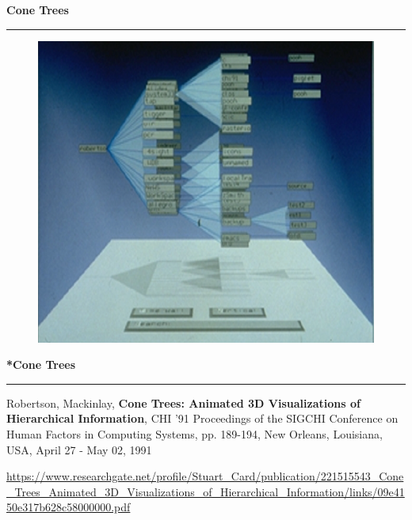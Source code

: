 \documentclass[pdf]{beamer}
\begin{document}
\begin{frame}
{\textbf{Cone Trees}}{\textcolor{red}{\rule{12cm}{1.2pt}}}

\begin{figure}
\includegraphics[scale=0.4]{43_Picture1.png}
\end{figure}

\end{frame}



\begin{frame}
{\textbf{*Cone Trees}}{\textcolor{red}{\rule{12cm}{1.2pt}}}

Robertson, Mackinlay, \textbf{Cone Trees: Animated 3D Visualizations of Hierarchical Information}, CHI '91 Proceedings of the SIGCHI Conference on Human Factors in Computing Systems, pp. 189-194, New Orleans, Louisiana, USA, April 27 - May 02, 1991 
\newline

\url{https://www.researchgate.net/profile/Stuart_Card/publication/221515543_Cone_Trees_Animated_3D_Visualizations_of_Hierarchical_Information/links/09e4150e317b628c58000000.pdf}

\end{frame}
\end{document}
